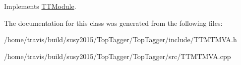 Implements \hyperlink{classTTModule_a14e7c03fbf4ee1a5008c9344adc7c896}{T\-T\-Module}.



The documentation for this class was generated from the following files\-:\begin{DoxyCompactItemize}
\item 
/home/travis/build/susy2015/\-Top\-Tagger/\-Top\-Tagger/include/T\-T\-M\-T\-M\-V\-A.\-h\item 
/home/travis/build/susy2015/\-Top\-Tagger/\-Top\-Tagger/src/T\-T\-M\-T\-M\-V\-A.\-cpp\end{DoxyCompactItemize}
